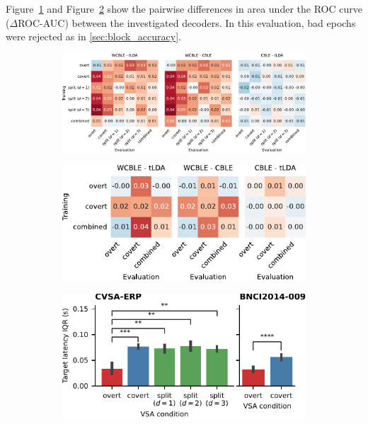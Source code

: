 Figure~\ref{fig:covert_cross_eval} and Figure~\ref{fig:aloise2012_cross_eval} show
the pairwise differences in area under the ROC curve ($\Delta$ROC-AUC)
between the investigated decoders.
In this evaluation, bad epochs were rejected as in \cref{sec:block_accuracy}.
\begin{figure}
  \bigskip
	\begin{subfigure}{\linewidth}
		\caption{}
		\label{fig:covert_cross_eval}
		\includegraphics[width=\linewidth]{figures/covert_align/figure5a.pdf}
	\end{subfigure}

	\bigskip
	\bigskip

	\begin{subfigure}[c]{.48\linewidth}
		\caption{}
		\label{fig:aloise2012_cross_eval}
		\includegraphics[width=\linewidth]{figures/covert_align/figure5b.pdf}
	\end{subfigure}\hfill%
	\begin{subfigure}[c]{.48\linewidth}
		\caption{}
		\label{fig:jitter}
		\includegraphics[width=\linewidth]{figures/covert_align/figure5c.pdf}
	\end{subfigure}


\end{figure}
